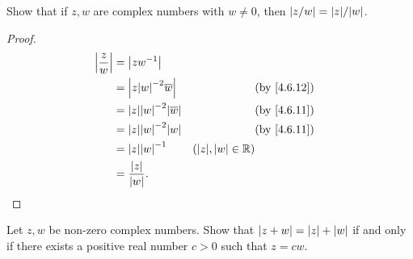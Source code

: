 \begin{ex}\label{ex:4.6.7}
  Show that if \(z, w\) are complex numbers with \(w \neq 0\), then \(\abs{z / w} = \abs{z} / \abs{w}\).
\end{ex}

\begin{proof}
  \begin{align*}
    \abs{\dfrac{z}{w}} & = \abs{z w^{-1}}                                                                                  \\
                       & = \abs{z \abs{w}^{-2} \overline{w}}       &                           & \text{(by \cref{4.6.12})} \\
                       & = \abs{z} \abs{w}^{-2} \abs{\overline{w}} &                           & \text{(by \cref{4.6.11})} \\
                       & = \abs{z} \abs{w}^{-2} \abs{w}            &                           & \text{(by \cref{4.6.11})} \\
                       & = \abs{z} \abs{w}^{-1}                    & (\abs{z}, \abs{w} \in \R)                             \\
                       & = \dfrac{\abs{z}}{\abs{w}}.
  \end{align*}
\end{proof}

\begin{ex}\label{ex:4.6.8}
  Let \(z, w\) be non-zero complex numbers.
  Show that \(\left\lvert z + w\right\rvert = \left\lvert z\right\rvert + \left\lvert w\right\rvert\) if and only if there exists a positive real number \(c > 0\) such that \(z = cw\).
\end{ex}

